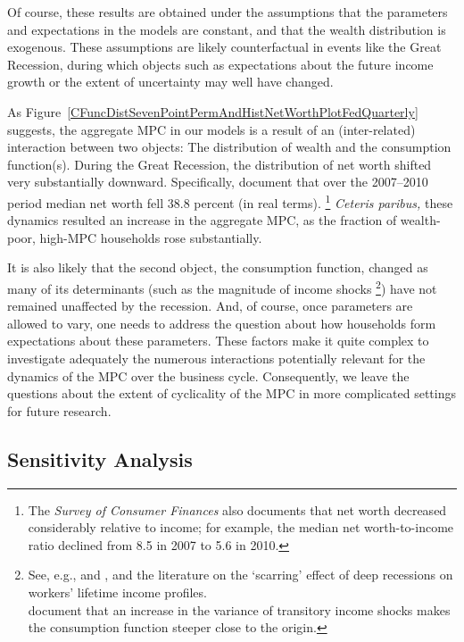 \documentclass[12pt,titlepage]{econtex}
\begin{document}
Of course, these results are obtained under the assumptions that the parameters and expectations in the models are constant, and that the wealth distribution is exogenous.   These assumptions are likely counterfactual in events like the Great Recession, during which objects such as expectations about the future income growth or the extent of uncertainty may well have changed.

As Figure~\ref{CFuncDistSevenPointPermAndHistNetWorthPlotFedQuarterly} suggests, the aggregate MPC in our models is a result of an (inter-related) interaction between two objects:  The  distribution of wealth and the consumption function(s). During the Great Recession, the distribution of net worth shifted very substantially downward.  Specifically, \cite{brickerEtAl:SCF2010} document that over the 2007--2010 period median net worth fell 38.8 percent (in real terms).%
\footnote{%
  The \emph{Survey of Consumer Finances} also documents that net worth decreased considerably relative to income; for example, the median net worth-to-income ratio declined from 8.5 in 2007 to 5.6 in 2010.
}
\emph{Ceteris paribus,} these dynamics resulted an increase in the aggregate MPC, as the fraction of wealth-poor, high-MPC households rose substantially.

It is also likely that the second object, the consumption function, changed as many of its determinants (such as the magnitude of income shocks%
\footnote{%
  See, e.g., \cite{gosCyclical} and \cite{Blundell:2013tm}, and the literature on the `scarring' effect of deep recessions on workers' lifetime income profiles.\\
  \cite{cstMPCxc} document that an increase in the variance of transitory income shocks makes the consumption function steeper close to the origin.
}) have not remained unaffected by the recession. And, of course, once parameters are allowed to vary, one needs to address the question about how households form expectations about these parameters. These factors make it quite complex to investigate adequately the numerous interactions potentially relevant for the dynamics of the MPC over the business cycle. Consequently, we leave the questions about the extent of cyclicality of the MPC in more complicated settings for future research.


\subsection{Sensitivity Analysis}\label{sec:Sensitivity}
\end{document}
